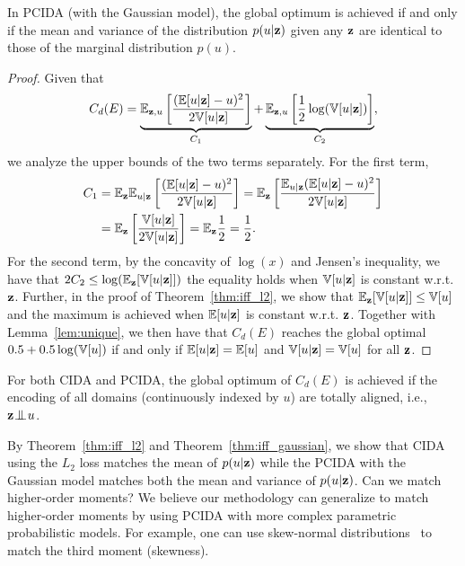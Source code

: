 \documentclass{article}
\newcommand{\lemref}[1]{Lemma~\ref{#1}}
\newcommand{\thmref}[1]{Theorem~\ref{#1}}
\begin{document}
\begin{theorem}\label{thm:iff_gaussian}
In PCIDA (with the Gaussian model), the global optimum is achieved if and only if the mean and variance of the distribution $p(u| {\bf z})$ given any ${\bf z}$ are identical to those of the marginal distribution $p(u)$.
\end{theorem}

\begin{proof}
Given that
\begin{align*}
C_d(E) = \underbrace{{\mathbb E}_{{\bf z},u}\left[\frac{({\mathbb E}[u|{\bf z}] - u)^2}{2{\mathbb V}[u|{\bf z}]}\right]}_{C_1} + \underbrace{{\mathbb E}_{{\bf z},u}\left[\frac{1}{2} \log({\mathbb V}[u|{\bf z}])\right]}_{C_2},
\end{align*}
we analyze the upper bounds of the two terms separately.
For the first term, 
\begingroup\makeatletter\def\f@size{9}\check@mathfonts
\begin{align*}
C_1
&={\mathbb E}_{{\bf z}}{\mathbb E}_{u|{\bf z}}\left[\frac{({\mathbb E}[u|{\bf z}] - u)^2}{2{\mathbb V}[u|{\bf z}]}\right]={\mathbb E}_{{\bf z}}\left[\frac{{\mathbb E}_{u|{\bf z}}({\mathbb E}[u|{\bf z}] - u)^2}{2{\mathbb V}[u|{\bf z}]}\right]\\
&={\mathbb E}_{{\bf z}}\left[\frac{{\mathbb V}[u|{\bf z}]}{2{\mathbb V}[u|{\bf z}]}\right]={\mathbb E}_{{\bf z}} \frac{1}{2}=\frac{1}{2}.
\end{align*}
\endgroup
For the second term, by the concavity of $\log(x)$ and Jensen's inequality, we have that $2 C_2 \leq \log({\mathbb E}_{\bf z} [{\mathbb V}[u|{\bf z}]])$ the equality holds when ${\mathbb V}[u|{\bf z}]$ is constant w.r.t. ${\bf z}$. Further, in the proof of \thmref{thm:iff_l2}, we show that ${\mathbb E}_{\bf z} [{\mathbb V}[u|{\bf z}]] \leq {\mathbb V}[u]$ and the maximum is achieved when ${\mathbb E}[u|{\bf z}]$ is constant w.r.t. ${\bf z}$. 
Together with \lemref{lem:unique}, we then have that $C_d(E)$ reaches the global optimal $0.5 + 0.5 \log({\mathbb V}[u])$ if and only if ${\mathbb E}[u|{\bf z}]={\mathbb E}[u]$ and ${\mathbb V}[u|{\bf z}]={\mathbb V}[u]$ for all ${\bf z}$.
\end{proof}

\begin{cor}\label{thm:achieve_cida}
For both CIDA and PCIDA, the global optimum of $C_d(E)$ is achieved if the encoding of all domains (continuously indexed by $u$) are totally aligned, i.e., ${\bf z} {\;\bot\!\!\!\!\!\!\bot\;} u$.
\end{cor}


\begin{remark}
By \thmref{thm:iff_l2} and \thmref{thm:iff_gaussian}, we show that CIDA using the $L_2$ loss matches the mean of $p(u | {\bf z})$ while the PCIDA with the Gaussian model matches both the mean and variance of $p(u | {\bf z})$. Can we match higher-order moments? We believe our methodology can generalize to match higher-order moments by using PCIDA with more complex parametric probabilistic models. For example, one can use skew-normal distributions~\cite{azzalini2013skew} to match the third moment (skewness). 

\end{remark}
\end{document}
